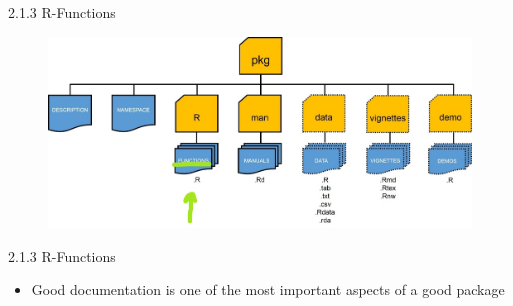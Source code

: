 \documentclass[11pt,a4paper]{beamer}
\begin{document}
\begin{frame}[t]{2.1.3 R-Functions}
	
	
	\begin{figure}
		\centering
		\includegraphics[width=0.9\linewidth]{Rfunc}
		\label{fig:packages}
	\end{figure}
	
	
\end{frame}






\begin{frame}[t]{2.1.3 R-Functions}
	
	\begin{itemize}
		\item  Good documentation	is	one	of	the	most	important	aspects	of	a	good package
	
		
			
	\end{itemize}
	
\end{frame}
\end{document}
